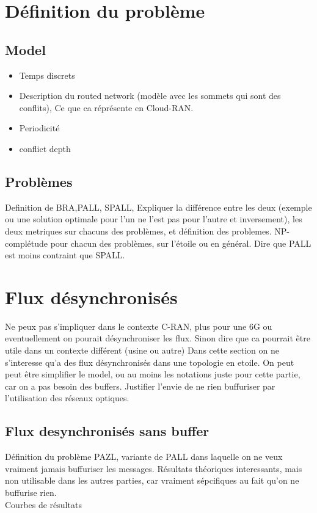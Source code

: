 \documentclass[a4paper,10pt]{article}
\begin{document}
\section{Définition du problème}

\subsection{Model}
\begin{itemize}
 \item Temps discrets
 \item Description du routed network (modèle avec les sommets qui sont des conflits), Ce que ca réprésente en Cloud-RAN.
 \item Periodicité
 \item conflict depth
 
\end{itemize}
\subsection{Problèmes}
Definition de BRA,PALL, SPALL, Expliquer la différence entre les deux (exemple ou une solution optimale pour l'un ne l'est pas pour l'autre et inversement), les deux metriques sur chacuns des problèmes, et définition des problemes. NP-complétude pour chacun des problèmes, sur l'étoile ou en général.
Dire que PALL est moins contraint que SPALL.


\section{Flux désynchronisés}
Ne peux pas s'impliquer dans le contexte C-RAN, plus pour une 6G ou eventuellement on pourait désynchroniser les flux. Sinon dire que ca pourrait être utile dans un contexte différent (usine ou autre)
Dans cette section on ne s'interesse qu'a des flux désynchronisés dans une topologie en etoile.
On peut peut être simplifier le model, ou au moins les notations juste pour cette partie, car on a pas besoin  des buffers.
Justifier l'envie de ne rien buffuriser par l'utilisation des réseaux optiques.
\subsection{Flux desynchronisés sans buffer}
Définition du problème PAZL, variante de PALL dans laquelle on ne veux vraiment jamais buffuriser les messages.
Résultats théoriques interessants, mais non utilisable dans les autres parties, car vraiment sépcifiques au fait qu'on ne buffurise rien.\\
Courbes de résultats
\end{document}
